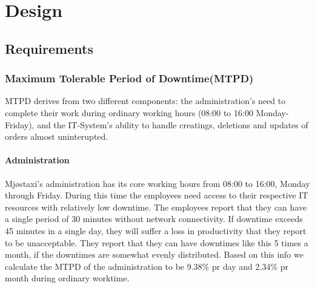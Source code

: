 \chapter{Design}
\label{chap:design}

\section{Requirements}\label{sec:reqirements}
\subsection*{Maximum Tolerable Period of Downtime(MTPD)}
\vspace{-0.6em}
MTPD derives from two different components: the administration's need to complete their work during ordinary working hours (08:00 to 16:00 Monday-Friday),
and the IT-System's ability to handle creatings, deletions and updates of orders almost uninterupted.

\subsubsection*{Administration}
\vspace{-0.6em}
Mjøstaxi's administration has its core working hours from 08:00 to 16:00, Monday through Friday.
During this time the employees need access to their respective IT resources with relatively low downtime.
The employees report that they can have a single period of 30 minutes without network connectivity. 
If downtime exceeds 45 minutes in a single day, they will suffer a loss in productivity that they report to be unacceptable. %
They report that they can have downtimes like this 5 times a month, if the downtimes are somewhat evenly distributed.
Based on this info we calculate the MTPD of the administration to be 9.38\% pr day and 2.34\% pr month during ordinary worktime.

